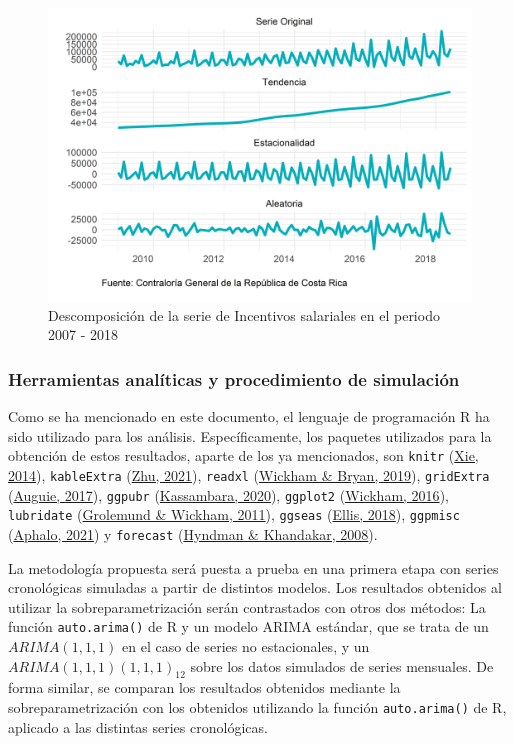 \documentclass[
]{article}
\begin{document}
\begin{figure}[H]
\includegraphics[width=1\linewidth,height=1\textheight]{Tesis_files/figure-latex/interesesplotdescomposicion-1} \caption{Descomposición de la serie de Incentivos salariales en el periodo 2007 - 2018}\label{fig:interesesplotdescomposicion}
\end{figure}

\subsubsection{Herramientas analíticas y procedimiento de simulación}

Como se ha mencionado en este documento, el lenguaje de programación R
ha sido utilizado para los análisis. Específicamente, los paquetes
utilizados para la obtención de estos resultados, aparte de los ya
mencionados, son \texttt{knitr} (\protect\hyperlink{ref-knitr}{Xie,
2014}), \texttt{kableExtra} (\protect\hyperlink{ref-kableExtra}{Zhu,
2021}), \texttt{readxl} (\protect\hyperlink{ref-readxl}{Wickham \&
Bryan, 2019}), \texttt{gridExtra}
(\protect\hyperlink{ref-gridExtra}{Auguie, 2017}), \texttt{ggpubr}
(\protect\hyperlink{ref-ggpubr}{Kassambara, 2020}), \texttt{ggplot2}
(\protect\hyperlink{ref-ggplot2}{Wickham, 2016}), \texttt{lubridate}
(\protect\hyperlink{ref-lubridate}{Grolemund \& Wickham, 2011}),
\texttt{ggseas} (\protect\hyperlink{ref-ggseas}{Ellis, 2018}),
\texttt{ggpmisc} (\protect\hyperlink{ref-ggpmisc}{Aphalo, 2021}) y
\texttt{forecast} (\protect\hyperlink{ref-forecast}{Hyndman \&
Khandakar, 2008}).

La metodología propuesta será puesta a prueba en una primera etapa con
series cronológicas simuladas a partir de distintos modelos. Los
resultados obtenidos al utilizar la sobreparametrización serán
contrastados con otros dos métodos: La función \texttt{auto.arima()} de
R y un modelo ARIMA estándar, que se trata de un \(ARIMA(1,1,1)\) en el
caso de series no estacionales, y un \(ARIMA(1,1,1)(1,1,1)_{12}\) sobre
los datos simulados de series mensuales. De forma similar, se comparan
los resultados obtenidos mediante la sobreparametrización con los
obtenidos utilizando la función \texttt{auto.arima()} de R, aplicado a
las distintas series cronológicas.
\end{document}
